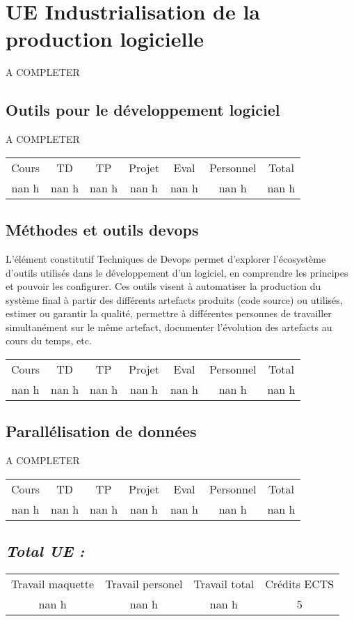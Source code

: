 \section{UE Industrialisation de la production logicielle}%
\label{sec:UEIndustrialisationdelaproductionlogicielle}%
A COMPLETER%
\subsection{Outils pour le développement logiciel }%
\label{subsec:Outilspourledveloppementlogiciel}%

%
A COMPLETER%
\begin{longtable}{c c c c c c c}%
\hline%
Cours&TD&TP&Projet&Eval&Personnel&Total\\%
nan h&nan h&nan h&nan h&nan h&nan h&nan h\\%
\hline%
\end{longtable}%
\subsection{Méthodes et outils devops}%
\label{subsec:Mthodesetoutilsdevops}%

%
L'élément constitutif Techniques de Devops permet d’explorer l’écosystème d’outils utilisés dans le développement d'un logiciel, en comprendre les principes et pouvoir les configurer. Ces outils visent à automatiser la production du système final à partir des différents artefacts produits (code source) ou utilisés, estimer ou garantir la qualité, permettre à différentes personnes de travailler simultanément sur le même artefact, documenter l'évolution des artefacts au cours du temps, etc.%
\begin{longtable}{c c c c c c c}%
\hline%
Cours&TD&TP&Projet&Eval&Personnel&Total\\%
nan h&nan h&nan h&nan h&nan h&nan h&nan h\\%
\hline%
\end{longtable}%
\subsection{Parallélisation de données}%
\label{subsec:Paralllisationdedonnes}%

%
A COMPLETER%
\begin{longtable}{c c c c c c c}%
\hline%
Cours&TD&TP&Projet&Eval&Personnel&Total\\%
nan h&nan h&nan h&nan h&nan h&nan h&nan h\\%
\hline%
\end{longtable}%
\subsection{\textit{Total UE :}}%
\label{subsec:textitTotalUE}%

%
\begin{longtable}{c c c c}%
\hline%
Travail maquette&Travail personel&Travail total&Crédits ECTS\\%
nan h&nan h&nan h&5\\%
\hline%
\end{longtable}